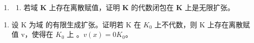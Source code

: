 \begin{enumerate}
\def\labelenumi{\arabic{enumi}.}
\setcounter{enumi}{21}
\tightlist
\item
  \begin{enumerate}
  \def\labelenumii{(\alph{enumii})}
  \tightlist
  \item
    若域 \(\mathbf{K}\) 上存在离散赋值，证明 \(\mathbf{K}\) 的代数闭包在 \(\mathbf{K}\) 上是无限扩张。
  \end{enumerate}
\end{enumerate}

\begin{enumerate}
\def\labelenumi{(\alph{enumi})}
\setcounter{enumi}{1}
\tightlist
\item
  设 K 为域  的有限生成扩张。证明若 K 在 \(K_{0}\) 上不代数，则 K 上存在离散赋值 v，使得在 \(K_{0}\) 上 。\(v(x) = 0\)\(K_{0}\)。
\end{enumerate}

